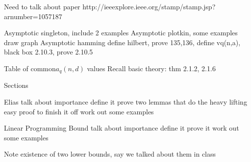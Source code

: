\documentclass{article}
\numberwithin{theorem}{subsection}
\numberwithin{lemma}{subsection}
\theoremstyle{definition}
\numberwithin{exmp}{subsection}
\theoremstyle{definition}
\numberwithin{defn}{subsection}
\theoremstyle{definition}
\numberwithin{claim}{subsection}
\begin{document}
Need to talk about paper
http://ieeexplore.ieee.org/stamp/stamp.jsp?arnumber=1057187




Asymptotic singleton, include 2 examples
Asymptotic plotkin, some examples
draw graph
Asymptotic hamming
	define hilbert, prove 135,136, define vq(n,a),
	black box 2.10.3, prove 2.10.5


Table of common$a_q(n,d)$ values
Recall basic theory: thm 2.1.2, 2.1.6

Sections


Elias
talk about importance
define it
prove two lemmas that do the heavy lifting
easy proof to finish it off
work out some examples

Linear Programming Bound
talk about importance
define it
prove it
work out some examples


Note existence of two lower bounds, say we talked about them in class
\end{document}
